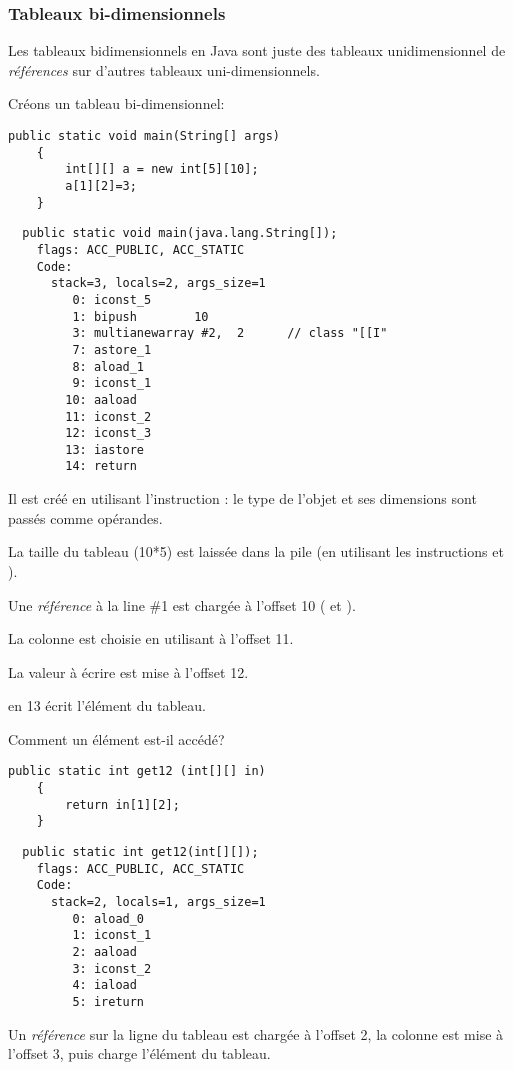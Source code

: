 \subsubsection{Tableaux bi-dimensionnels}

Les tableaux bidimensionnels en Java sont juste des tableaux unidimensionnel de
\emph{références} sur d'autres tableaux uni-dimensionnels.

Créons un tableau bi-dimensionnel:

\begin{lstlisting}[style=customjava]
	public static void main(String[] args)
	{
		int[][] a = new int[5][10];
		a[1][2]=3;
	}
\end{lstlisting}

\begin{lstlisting}
  public static void main(java.lang.String[]);
    flags: ACC_PUBLIC, ACC_STATIC
    Code:
      stack=3, locals=2, args_size=1
         0: iconst_5
         1: bipush        10
         3: multianewarray #2,  2      // class "[[I"
         7: astore_1
         8: aload_1
         9: iconst_1
        10: aaload
        11: iconst_2
        12: iconst_3
        13: iastore
        14: return
\end{lstlisting}

Il est créé en utilisant l'instruction : le type de l'objet et
ses dimensions sont passés comme opérandes.

La taille du tableau (10*5) est laissée dans la pile (en utilisant les instructions
 et ).

Une \emph{référence} à la line \#1 est chargée à l'offset 10 ( et ).

La colonne est choisie en utilisant  à l'offset 11.

La valeur à écrire est mise à l'offset 12.

 en 13 écrit l'élément du tableau.

Comment un élément est-il accédé?

\begin{lstlisting}[style=customjava]
	public static int get12 (int[][] in)
	{
		return in[1][2];
	}
\end{lstlisting}

\begin{lstlisting}
  public static int get12(int[][]);
    flags: ACC_PUBLIC, ACC_STATIC
    Code:
      stack=2, locals=1, args_size=1
         0: aload_0
         1: iconst_1
         2: aaload
         3: iconst_2
         4: iaload
         5: ireturn
\end{lstlisting}

Un \emph{référence} sur la ligne du tableau est chargée à l'offset 2, la colonne
est mise à l'offset 3, puis  charge l'élément du tableau.


